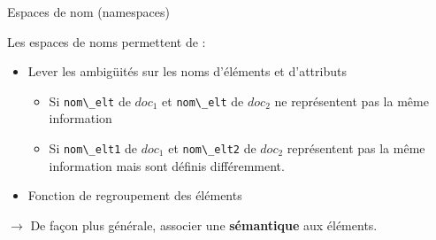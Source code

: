 \begin{frame}{Espaces de nom (namespaces)}

Les espaces de noms permettent de :
\begin{itemize}
\item Lever les ambig\"uit\'es sur les noms d'\'el\'ements et d'attributs
\begin{itemize}
\item Si \verb?nom\_elt? de $doc_1$ et \verb?nom\_elt? de $doc_2$ ne repr\'esentent pas la m\^eme information
\item Si \verb?nom\_elt1? de $doc_1$ et \verb?nom\_elt2? de $doc_2$ repr\'esentent pas la m\^eme information mais sont d\'efinis diff\'eremment.
\end{itemize}
\item Fonction de regroupement des \'el\'ements
\end{itemize}

$\rightarrow$ De fa\c{c}on plus g\'en\'erale, associer une \textbf{s\'emantique} aux \'el\'ements.


\end{frame}



 
 




